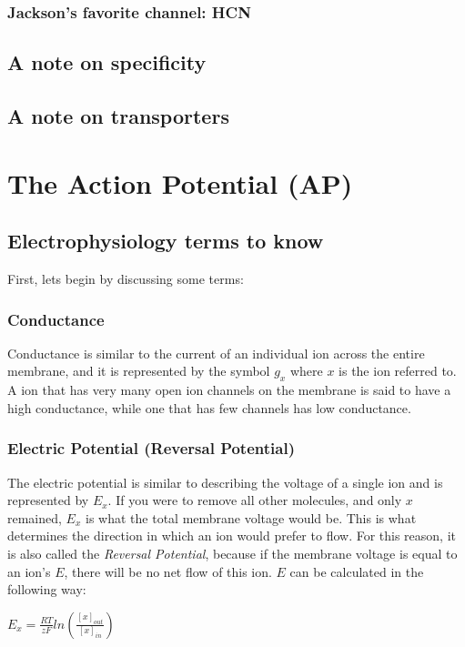 \documentclass[12pt]{amsart}
\begin{document}
\subsubsection{Jackson's favorite channel: HCN}
\subsection{A note on specificity}
\subsection{A note on transporters}


\section{The Action Potential (AP)}

\subsection{Electrophysiology terms to know} First, lets begin by discussing some terms: 

\subsubsection{Conductance} Conductance is similar to the current of an individual ion across the entire membrane, and it is represented by the symbol $g_x$ where $x$ is the ion referred to. A ion that has very many open ion channels on the membrane is said to have a high conductance, while one that has few channels has low conductance. 


\subsubsection{Electric Potential (Reversal Potential)} The electric potential is similar to describing the voltage of a single ion and is represented by $E_x$. If you were to remove all other molecules, and only $x$ remained, $E_x$ is what the total membrane voltage would be. This is what determines the direction in which an ion would prefer to flow. For this reason, it is also called the \textit{Reversal Potential}, because if the membrane voltage is equal to an ion's $E$, there will be no net flow of this ion. $E$ can be calculated in the following way: 

\medskip

\begin{center}
    
    $E_x = \frac{RT}{zF}ln(\frac{[x]_{out}}{[x]_{in}})$
    
\end{center}
\end{document}
